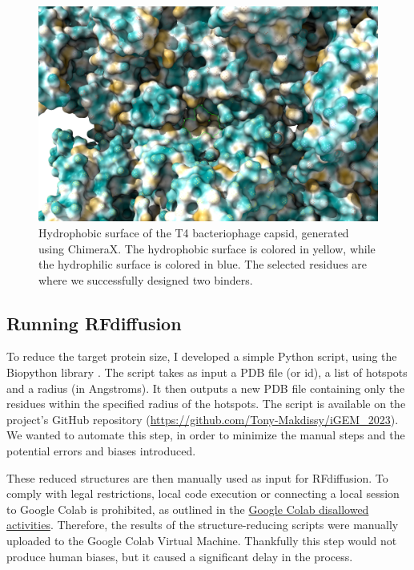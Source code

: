 \documentclass[11pt,a4paper]{article}
\begin{document}
\begin{figure}[ht]
\centering
\includegraphics[width=\textwidth]{Supplementary Data/Figures/hydrophobic_view.png}
\caption{Hydrophobic surface of the T4 bacteriophage capsid, generated using ChimeraX. The hydrophobic surface is colored in yellow, while the hydrophilic surface is colored in blue. The selected residues are where we successfully designed two binders.}
\label{fig:protein_inspection_results}
\end{figure}


\subsection{Running RFdiffusion}

To reduce the target protein size, I developed a simple Python script, using the Biopython library \cite{biopython}. The script takes as input a PDB file (or id), a list of hotspots and a radius (in Angstroms). It then outputs a new PDB file containing only the residues within the specified radius of the hotspots. The script is available on the project's GitHub repository (\url{https://github.com/Tony-Makdissy/iGEM_2023}). We wanted to automate this step, in order to minimize the manual steps and the potential errors and biases introduced.

These reduced structures are then manually used as input for RFdiffusion. To comply with legal restrictions, local code execution or connecting a local session to Google Colab is prohibited, as outlined in the \href{https://research.google.com/colaboratory/faq.html#disallowed-activities}{Google Colab disallowed activities}. Therefore, the results of the structure-reducing scripts were manually uploaded to the Google Colab Virtual Machine. Thankfully this step would not produce human biases, but it caused a significant delay in the process.
\end{document}
